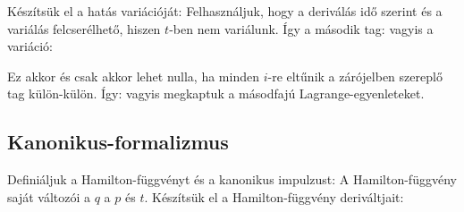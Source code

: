    Készítsük el a hatás variációját: 
   Felhasználjuk, hogy a deriválás idő szerint és a variálás felcserélhető, hiszen $t$-ben nem variálunk. Így a második tag:
   vagyis a variáció:
   
   Ez akkor és csak akkor lehet nulla, ha minden $i$-re eltűnik a zárójelben szereplő tag külön-külön. Így:
   vagyis megkaptuk a másodfajú Lagrange-egyenleteket. 
  
  \subsection{Kanonikus-formalizmus}
   
   Definiáljuk a Hamilton-függvényt és a kanonikus impulzust:
   A Hamilton-függvény saját változói a $q$ a $p$ és $t$.
   Készítsük el a Hamilton-függvény deriváltjait:
   
